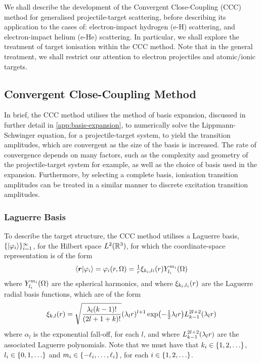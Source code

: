\documentclass[draft]{article}
\begin{document}
We shall describe the development of the Convergent Close-Coupling (CCC) method
for generalised projectile-target scattering, before describing its application
to the cases of: electron-impact hydrogen (e-H) scattering, and electron-impact
helium (e-He) scattering.
In particular, we shall explore the treatment of target ionisation within the CCC
method.
Note that in the general treatment, we shall restrict our attention to electron
projectiles and atomic/ionic targets.

\subsection{Convergent Close-Coupling Method}
\label{sec:ccc-method}

In brief, the CCC method utilises the method of basis expansion, discussed in
further detail in \autoref{app:basis-expansion}, to numerically solve the
Lippmann-Schwinger equation, for a projectile-target system, to yield the
transition amplitudes, which are convergent as the size of the basis is
increased.
The rate of convergence depends on many factors, such as the complexity and
geometry of the projectile-target system for example, as well as the choice of
basis used in the expansion.
Furthermore, by selecting a complete basis, ionisation transition amplitudes can
be treated in a similar manner to discrete excitation transition amplitudes.

\subsubsection{Laguerre Basis}
\label{sec:laguerre-basis}

To describe the target structure, the CCC method utilises a Laguerre basis,
$\lbrace\ket{\varphi_{i}}\rbrace_{i = 1}^{\infty}$, for the Hilbert space
$L^{2}(\mathbb{R}^{3})$, for which the coordinate-space representation is of the
form
\begin{equation}
  \label{eq:laguerre-basis}
  \bra{\boldsymbol{r}}
  \ket{\varphi_{i}}
  =
  \varphi_{i}(r, \Omega)
  =
  \tfrac{1}{r}
  \xi_{k_{i}, l{i}}(r)
  Y_{l_{i}}^{m_{i}}(\Omega)
\end{equation}
where $Y_{l_{i}}^{m_{i}}(\Omega)$ are the spherical harmonics, and where
$\xi_{k_{i}, l_{i}}(r)$ are the Laguerre radial basis functions, which are of
the form
\begin{equation}
  \label{eq:laguerre-radial-basis}
  \xi_{k, l}\lr{r}
  =
  \sqrt
  {
    \dfrac
    {
      \lambda_{l}
      \lr{k - 1}!
    }
    {
      \lr{2l + 1 + k}!
    }
  }
  \lr{\lambda_{l} r}^{l + 1}
  \exponential\lr[\big]{- \tfrac{1}{2} \lambda_{l} r}
  L_{k - 1}^{2l + 2}\lr{\lambda_{l} r}
\end{equation}
where $\alpha_{l}$ is the exponential fall-off, for each $l$, and where
$L_{k - 1}^{2l + 2}(\lambda_{l} r)$ are the associated Laguerre polynomials.
Note that we must have that
$k_{i} \in \lrset{1, 2, \dotsc}$,
$l_{i} \in \lrset{0, 1, \dotsc}$ and
$m_{i} \in \lbrace-\ell_{i}, \dotsc, \ell_{i}\rbrace$, for each
$i \in \lrset{1, 2, \dotsc}$.
\end{document}
